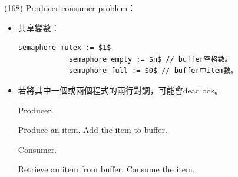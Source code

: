 \begin{theorem}{(168)} Producer-consumer problem：\begin{itemize}
        \item 共享變數：\begin{lstlisting}[caption={Shared variables of Producer-consumer problem.}, captionpos=b, mathescape=true]
            semaphore mutex := $1$
            semaphore empty := $n$ // buffer空格數。
            semaphore full := $0$ // buffer中item數。
        \end{lstlisting}
        \item 若將其中一個或兩個程式的兩行對調，可能會deadlock。
        \begin{algorithm}[H]
            \caption{Producer.}
            \begin{algorithmic}[1]
                    \Repeat
                        \State Produce an item.
                        \State {}
                        \State {}
                        \State Add the item to buffer.
                        \State {}
                        \State {}
                \EndFunction
            \end{algorithmic}
        \end{algorithm}
        \begin{algorithm}[H]
            \caption{Consumer.}
            \begin{algorithmic}[1]
                    \Repeat
                        \State {}
                        \State {}
                        \State Retrieve an item from buffer.
                        \State {}
                        \State {}
                        \State Consume the item.
                \EndFunction
            \end{algorithmic}
        \end{algorithm}
    \end{itemize}
\end{theorem}

